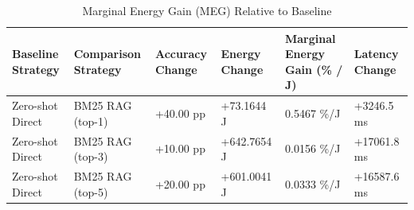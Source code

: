 \begin{table}
\caption{Marginal Energy Gain (MEG) Relative to Baseline}
\label{tab:marginal_energy_gain}
\begin{tabular}{llllll}
\toprule
Baseline Strategy & Comparison Strategy & Accuracy Change & Energy Change & Marginal Energy Gain (\% / J) & Latency Change \\
\midrule
Zero-shot Direct & BM25 RAG (top-1) & +40.00 pp & +73.1644 J & 0.5467 \%/J & +3246.5 ms \\
Zero-shot Direct & BM25 RAG (top-3) & +10.00 pp & +642.7654 J & 0.0156 \%/J & +17061.8 ms \\
Zero-shot Direct & BM25 RAG (top-5) & +20.00 pp & +601.0041 J & 0.0333 \%/J & +16587.6 ms \\
\bottomrule
\end{tabular}
\end{table}
